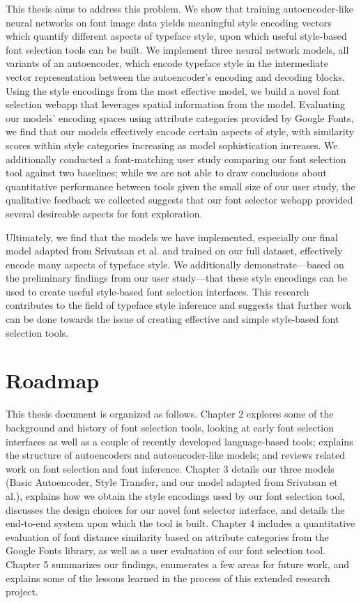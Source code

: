 This thesis aims to address this problem. We show that training autoencoder-like neural networks on font image data yields meaningful style encoding vectors which quantify different aspects of typeface style, upon which useful style-based font selection tools can be built. We implement three neural network models, all variants of an autoencoder, which encode typeface style in the intermediate vector representation between the autoencoder's encoding and decoding blocks. Using the style encodings from the most effective model, we build a novel font selection webapp that leverages spatial information from the model. Evaluating our models' encoding spaces using attribute categories provided by Google Fonts, we find that our models effectively encode certain aspects of style, with similarity scores within style categories increasing as model sophistication increases. We additionally conducted a font-matching user study comparing our font selection tool against two baselines; while we are not able to draw conclusions about quantitative performance between tools given the small size of our user study, the qualitative feedback we collected suggests that our font selector webapp provided several desireable aspects for font exploration.

Ultimately, we find that the models we have implemented, especially our final model adapted from Srivatsan et al. \cite{srivatsan2020} and trained on our full dataset, effectively encode many aspects of typeface style. We additionally demonstrate---based on the preliminary findings from our user study---that these style encodings can be used to create useful style-based font selection interfaces. This research contributes to the field of typeface style inference and suggests that further work can be done towards the issue of creating effective and simple style-based font selection tools.

\section{Roadmap}

This thesis document is organized as follows. Chapter 2 explores some of the background and history of font selection tools, looking at early font selection interfaces as well as a couple of recently developed language-based tools; explains the structure of autoencoders and autoencoder-like models; and reviews related work on font selection and font inference. Chapter 3 details our three models (Basic Autoencoder, Style Transfer, and our model adapted from Srivatsan et al.), explains how we obtain the style encodings used by our font selection tool, discusses the design choices for our novel font selector interface, and details the end-to-end system upon which the tool is built. Chapter 4 includes a quantitative evaluation of font distance similarity based on attribute categories from the Google Fonts library, as well as a user evaluation of our font selection tool. Chapter 5 summarizes our findings, enumerates a few areas for future work, and explains some of the lessons learned in the process of this extended research project.